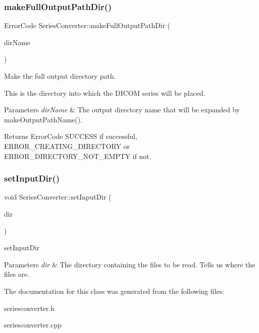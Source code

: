 \subsubsection{\texorpdfstring{make\+Full\+Output\+Path\+Dir()}{makeFullOutputPathDir()}}
{\footnotesize\ttfamily Error\+Code Series\+Converter\+::make\+Full\+Output\+Path\+Dir (\begin{DoxyParamCaption}\item[{const Q\+String \&}]{dir\+Name }\end{DoxyParamCaption})}



Make the full output directory path. 

This is the directory into which the D\+I\+C\+OM series will be placed. 
\begin{DoxyParams}{Parameters}
{\em dir\+Name} & The output directory name that will be expanded by make\+Output\+Path\+Name(). \\
\hline
\end{DoxyParams}
\begin{DoxyReturn}{Returns}
Error\+Code S\+U\+C\+C\+E\+SS if successful, E\+R\+R\+O\+R\+\_\+\+C\+R\+E\+A\+T\+I\+N\+G\+\_\+\+D\+I\+R\+E\+C\+T\+O\+RY or E\+R\+R\+O\+R\+\_\+\+D\+I\+R\+E\+C\+T\+O\+R\+Y\+\_\+\+N\+O\+T\+\_\+\+E\+M\+P\+TY if not. 
\end{DoxyReturn}
\mbox{\label{class_series_converter_aeae7772dca9eaa2ad685cb7c3b79dbf0}} 
\subsubsection{\texorpdfstring{set\+Input\+Dir()}{setInputDir()}}
{\footnotesize\ttfamily void Series\+Converter\+::set\+Input\+Dir (\begin{DoxyParamCaption}\item[{const Q\+Dir \&}]{dir }\end{DoxyParamCaption})\hspace{0.3cm}{\ttfamily [inline]}}



set\+Input\+Dir 


\begin{DoxyParams}{Parameters}
{\em dir} & The directory containing the files to be read. Tells us where the files are. \\
\hline
\end{DoxyParams}


The documentation for this class was generated from the following files\+:\begin{DoxyCompactItemize}
\item 
seriesconverter.\+h\item 
seriesconverter.\+cpp\end{DoxyCompactItemize}
